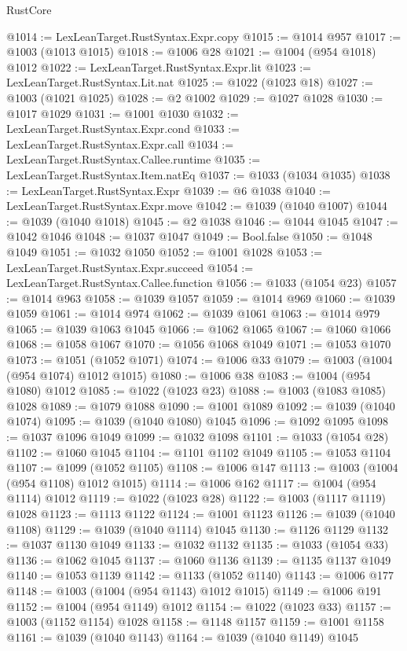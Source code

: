 \begin{lexlean}{RustCore}
\begin{coremodule}
@1014 := LexLeanTarget.RustSyntax.Expr.copy
@1015 := @1014 @957
@1017 := @1003 (@1013 @1015)
@1018 := @1006 @28
@1021 := @1004 (@954 @1018) @1012
@1022 := LexLeanTarget.RustSyntax.Expr.lit
@1023 := LexLeanTarget.RustSyntax.Lit.nat
@1025 := @1022 (@1023 @18)
@1027 := @1003 (@1021 @1025)
@1028 := @2 @1002
@1029 := @1027 @1028
@1030 := @1017 @1029
@1031 := @1001 @1030
@1032 := LexLeanTarget.RustSyntax.Expr.cond
@1033 := LexLeanTarget.RustSyntax.Expr.call
@1034 := LexLeanTarget.RustSyntax.Callee.runtime
@1035 := LexLeanTarget.RustSyntax.Item.natEq
@1037 := @1033 (@1034 @1035)
@1038 := LexLeanTarget.RustSyntax.Expr
@1039 := @6 @1038
@1040 := LexLeanTarget.RustSyntax.Expr.move
@1042 := @1039 (@1040 @1007)
@1044 := @1039 (@1040 @1018)
@1045 := @2 @1038
@1046 := @1044 @1045
@1047 := @1042 @1046
@1048 := @1037 @1047
@1049 := Bool.false
@1050 := @1048 @1049
@1051 := @1032 @1050
@1052 := @1001 @1028
@1053 := LexLeanTarget.RustSyntax.Expr.succeed
@1054 := LexLeanTarget.RustSyntax.Callee.function
@1056 := @1033 (@1054 @23)
@1057 := @1014 @963
@1058 := @1039 @1057
@1059 := @1014 @969
@1060 := @1039 @1059
@1061 := @1014 @974
@1062 := @1039 @1061
@1063 := @1014 @979
@1065 := @1039 @1063 @1045
@1066 := @1062 @1065
@1067 := @1060 @1066
@1068 := @1058 @1067
@1070 := @1056 @1068 @1049
@1071 := @1053 @1070
@1073 := @1051 (@1052 @1071)
@1074 := @1006 @33
@1079 := @1003 (@1004 (@954 @1074) @1012 @1015)
@1080 := @1006 @38
@1083 := @1004 (@954 @1080) @1012
@1085 := @1022 (@1023 @23)
@1088 := @1003 (@1083 @1085) @1028
@1089 := @1079 @1088
@1090 := @1001 @1089
@1092 := @1039 (@1040 @1074)
@1095 := @1039 (@1040 @1080) @1045
@1096 := @1092 @1095
@1098 := @1037 @1096 @1049
@1099 := @1032 @1098
@1101 := @1033 (@1054 @28)
@1102 := @1060 @1045
@1104 := @1101 @1102 @1049
@1105 := @1053 @1104
@1107 := @1099 (@1052 @1105)
@1108 := @1006 @147
@1113 := @1003 (@1004 (@954 @1108) @1012 @1015)
@1114 := @1006 @162
@1117 := @1004 (@954 @1114) @1012
@1119 := @1022 (@1023 @28)
@1122 := @1003 (@1117 @1119) @1028
@1123 := @1113 @1122
@1124 := @1001 @1123
@1126 := @1039 (@1040 @1108)
@1129 := @1039 (@1040 @1114) @1045
@1130 := @1126 @1129
@1132 := @1037 @1130 @1049
@1133 := @1032 @1132
@1135 := @1033 (@1054 @33)
@1136 := @1062 @1045
@1137 := @1060 @1136
@1139 := @1135 @1137 @1049
@1140 := @1053 @1139
@1142 := @1133 (@1052 @1140)
@1143 := @1006 @177
@1148 := @1003 (@1004 (@954 @1143) @1012 @1015)
@1149 := @1006 @191
@1152 := @1004 (@954 @1149) @1012
@1154 := @1022 (@1023 @33)
@1157 := @1003 (@1152 @1154) @1028
@1158 := @1148 @1157
@1159 := @1001 @1158
@1161 := @1039 (@1040 @1143)
@1164 := @1039 (@1040 @1149) @1045

\end{coremodule}
\end{lexlean}
